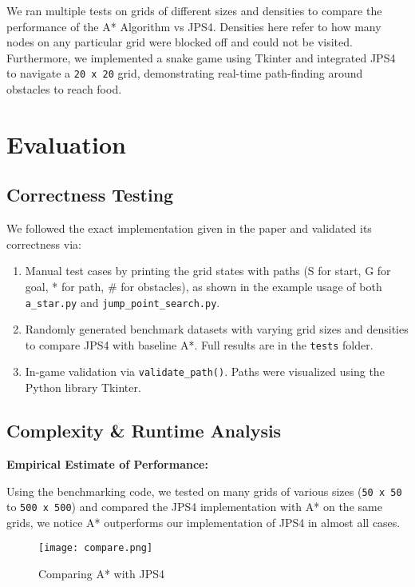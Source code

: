 \documentclass[11pt]{article}
\begin{document}
We ran multiple tests on grids of different sizes and densities to compare the performance of the A* Algorithm vs JPS4. Densities here refer to how many nodes on any particular grid were blocked off and could not be visited. Furthermore, we implemented a snake game using Tkinter and integrated JPS4 to navigate a \texttt{20 x 20} grid, demonstrating real-time path-finding around obstacles to reach food.




\section{Evaluation}
\subsection{Correctness Testing}

We followed the exact implementation given in the paper and validated its correctness via:

\begin{enumerate}
    \item Manual test cases by printing the grid states with paths (S for start, G for goal, * for path, \# for obstacles), as shown in the example usage of both \texttt{a\_star.py} and \texttt{jump\_point\_search.py}.
    \item Randomly generated benchmark datasets with varying grid sizes and densities to compare JPS4 with baseline A*. Full results are in the \texttt{tests} folder.
    \item In-game validation via \texttt{validate\_path()}. Paths were visualized using the Python library Tkinter.
\end{enumerate}

\subsection{Complexity \& Runtime Analysis}

\textbf{Empirical Estimate of Performance:}

Using the benchmarking code, we tested on many grids of various sizes (\texttt{50 x 50} to \texttt{500 x 500}) and compared the JPS4 implementation with A* on the same grids, we notice A* outperforms our implementation of JPS4 in almost all cases.

\begin{figure}[h!]
    \centering
    \texttt{[image: compare.png]}
    \caption{Comparing A* with JPS4}
    \label{fig:enter-label}
\end{figure}
\end{document}

